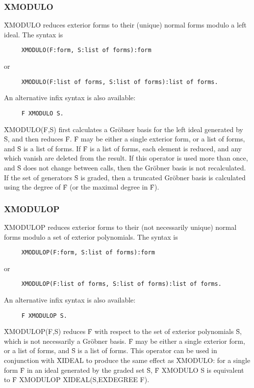 \subsubsection*{XMODULO}

\f{XMODULO} reduces exterior forms to their (unique) normal forms modulo a
left ideal. The syntax is
\begin{verbatim}
     XMODULO(F:form, S:list of forms):form
\end{verbatim}
or
\begin{verbatim}
     XMODULO(F:list of forms, S:list of forms):list of forms.
\end{verbatim}
An alternative infix syntax is also available:
\begin{verbatim}
     F XMODULO S.
\end{verbatim}
\f{XMODULO(F,S)} first calculates a Gr\"obner basis for the left ideal
generated by \f{S}, and then reduces \f{F}.  \f{F} may be either a single
exterior form, or a list of forms, and \f{S} is a list of forms.  If \f{F}
is a list of forms, each element is reduced, and any which vanish are
deleted from the result.  If this operator is used more than once, and
\f{S} does not change between calls, then the Gr\"obner basis is not
recalculated.  If the set of generators \f{S} is graded, then a truncated
Gr\"obner basis is calculated using the degree of \f{F} (or the maximal
degree in \f{F}).

\subsubsection*{XMODULOP}

\f{XMODULOP} reduces exterior forms to their (not necessarily unique)
normal forms modulo a set of exterior polynomials. The syntax
is
\begin{verbatim}
     XMODULOP(F:form, S:list of forms):form
\end{verbatim}
or
\begin{verbatim}
     XMODULOP(F:list of forms, S:list of forms):list of forms.
\end{verbatim}
An alternative infix syntax is also available:
\begin{verbatim}
     F XMODULOP S.
\end{verbatim}
\f{XMODULOP(F,S)} reduces \f{F} with respect to the set of exterior
polynomials \f{S}, which is not necessarily a Gr\"obner basis. \f{F} may be
either a single exterior form, or a list of forms, and \f{S} is a list of
forms. This operator can be used in conjunction with \f{XIDEAL} to produce
the same effect as \f{XMODULO}: for a single form \f{F} in an ideal
generated by the graded set \f{S}, \f{F XMODULO S} is equivalent to \f{F
XMODULOP XIDEAL(S,EXDEGREE F)}.


